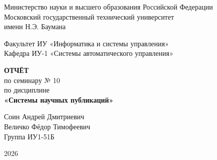 \begin{titlepage}
  \thispagestyle{empty}

  \begin{center}
    {\small
      Министерство науки и высшего образования Российской Федерации\\
      Московский государственный технический университет\\
      имени Н.Э. Баумана\\[0.4cm]
    }

    {\normalsize
      Факультет ИУ «Информатика и системы управления»\\
      Кафедра ИУ-1 «Системы автоматического управления»
    }

    \vfill

    {\Large\bfseries ОТЧЁТ}\\[0.4cm]
    {\large по семинару № 10}\\[0.3cm]
    {\large по дисциплине}\\[0.2cm]
    {\Large\bfseries «Системы научных публикаций»}

    \vfill
  \end{center}

  \begin{flushright}
    Соин Андрей Дмитриевич\\
    Величко  Фёдор Тимофеевич\\
    Группа ИУ1-51Б\\[0.2cm]

  \end{flushright}

  \vfill

  \begin{center}

    2026
  \end{center}
\end{titlepage}